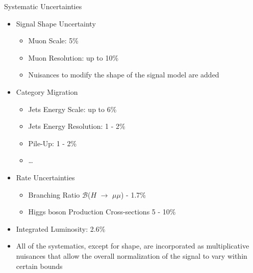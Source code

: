 \documentclass[pdf, 9pt]{beamer}
\begin{document}
  \begin{frame}{Systematic Uncertainties}
    \begin{itemize}
      \item Signal Shape Uncertainty
        \begin{itemize}
          \item Muon Scale: 5\%
          \item Muon Resolution: up to 10\%
          \item Nuisances to modify the shape of the signal model are added
        \end{itemize}
      \item Category Migration
        \begin{itemize}
          \item Jets Energy Scale: up to 6\%
          \item Jets Energy Resolution:  1 - 2\%
          \item Pile-Up: 1 - 2\%
          \item \dots
        \end{itemize}
      \item Rate Uncertainties
        \begin{itemize}
          \item Branching Ratio $\mathcal{B}$($H$ $\rightarrow$ $\mu\mu$) - 1.7\%
          \item Higgs boson Production Cross-sections 5 - 10\%
        \end{itemize}
      \item Integrated Luminosity: 2.6\%
      \item \alert{All of the systematics, except for shape, are incorporated as multiplicative nuisances that allow the overall normalization of the signal to vary within certain bounds}
    \end{itemize}
  \end{frame}
\end{document}
